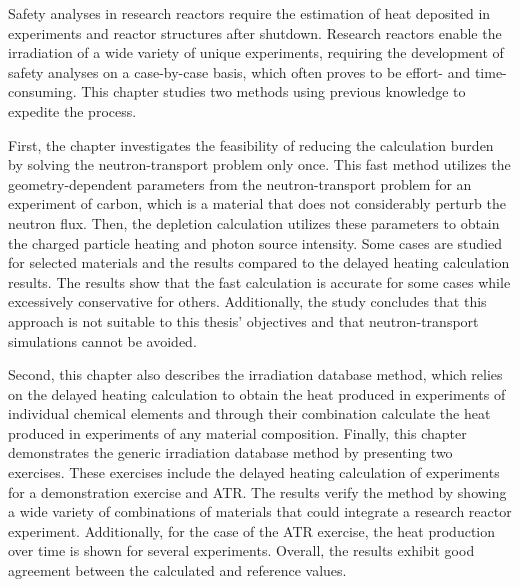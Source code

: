 Safety analyses in research reactors require the estimation of heat deposited in experiments and reactor structures after shutdown.
Research reactors enable the irradiation of a wide variety of unique experiments, requiring the development of safety analyses on a case-by-case basis, which often proves to be effort- and time-consuming.
This chapter studies two methods using previous knowledge to expedite the process.

First, the chapter investigates the feasibility of reducing the calculation burden by solving the neutron-transport problem only once.
This fast method utilizes the geometry-dependent parameters from the neutron-transport problem for an experiment of carbon, which is a material that does not considerably perturb the neutron flux.
Then, the depletion calculation utilizes these parameters to obtain the charged particle heating and photon source intensity.
Some cases are studied for selected materials and the results compared to the delayed heating calculation results.
The results show that the fast calculation is accurate for some cases while excessively conservative for others.
Additionally, the study concludes that this approach is not suitable to this thesis' objectives and that neutron-transport simulations cannot be avoided.

Second, this chapter also describes the irradiation database method, which relies on the delayed heating calculation to obtain the heat produced in experiments of individual chemical elements and through their combination calculate the heat produced in experiments of any material composition.
Finally, this chapter demonstrates the generic irradiation database method by presenting two exercises.
These exercises include the delayed heating calculation of experiments for a demonstration exercise and ATR.
The results verify the method by showing a wide variety of combinations of materials that could integrate a research reactor experiment.
Additionally, for the case of the ATR exercise, the heat production over time is shown for several experiments.
Overall, the results exhibit good agreement between the calculated and reference values.

